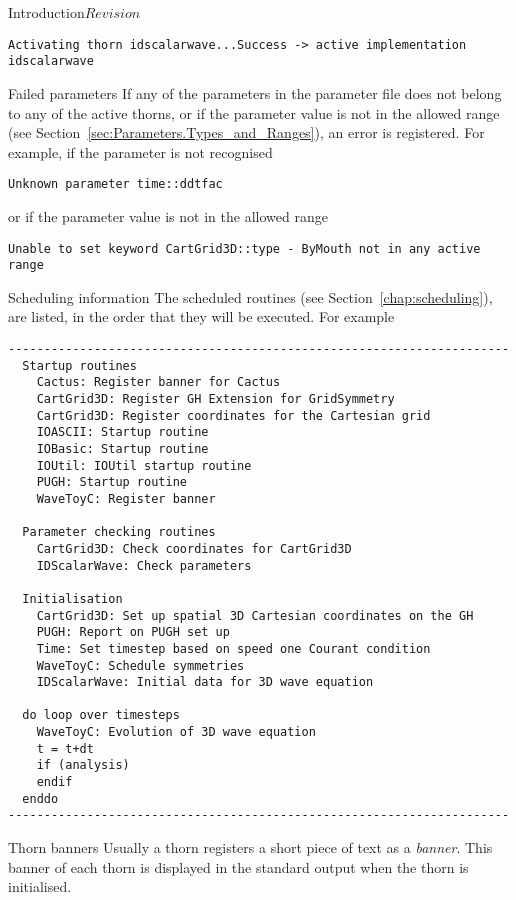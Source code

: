 \begin{cactuspart}{Introduction}{}{$Revision$}
\begin{Lentry}
\begin{verbatim}
Activating thorn idscalarwave...Success -> active implementation idscalarwave
\end{verbatim}

\item [Failed parameters]
         If any of the parameters in the parameter file does not belong to any
of the active thorns, or if the parameter value is not in the allowed range
(see Section~\ref{sec:Parameters.Types_and_Ranges}),
an error is registered. For example, if the parameter is not recognised

\begin{verbatim}
Unknown parameter time::ddtfac
\end{verbatim}
or if the parameter value is not in the allowed range

\begin{verbatim}
Unable to set keyword CartGrid3D::type - ByMouth not in any active range
\end{verbatim}

\item [Scheduling information]
        The scheduled routines (see Section~\ref{chap:scheduling}),
are listed, in the order that they will be executed. For example

\begin{verbatim}
----------------------------------------------------------------------
  Startup routines
    Cactus: Register banner for Cactus
    CartGrid3D: Register GH Extension for GridSymmetry
    CartGrid3D: Register coordinates for the Cartesian grid
    IOASCII: Startup routine
    IOBasic: Startup routine
    IOUtil: IOUtil startup routine
    PUGH: Startup routine
    WaveToyC: Register banner

  Parameter checking routines
    CartGrid3D: Check coordinates for CartGrid3D
    IDScalarWave: Check parameters

  Initialisation
    CartGrid3D: Set up spatial 3D Cartesian coordinates on the GH
    PUGH: Report on PUGH set up
    Time: Set timestep based on speed one Courant condition
    WaveToyC: Schedule symmetries
    IDScalarWave: Initial data for 3D wave equation

  do loop over timesteps
    WaveToyC: Evolution of 3D wave equation
    t = t+dt
    if (analysis)
    endif
  enddo
----------------------------------------------------------------------
\end{verbatim}

\item [Thorn banners]
        Usually a thorn registers a short piece of text as a \emph{banner}.
        This banner of each thorn is displayed in the standard output when
        the thorn is initialised.


\end{Lentry}
\end{cactuspart}
